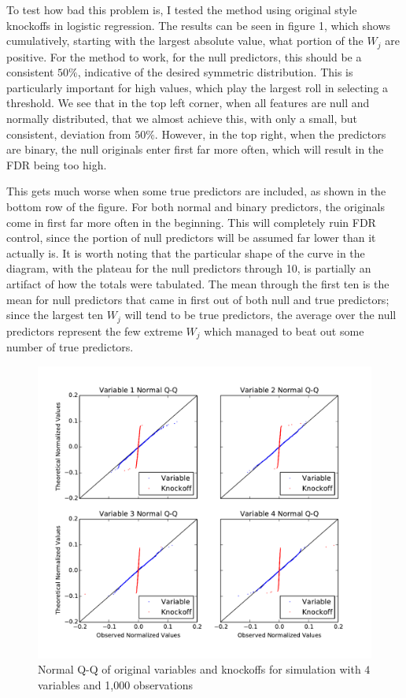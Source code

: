 \documentclass[11pt]{article}
\theoremstyle{definition}
\begin{document}
    To test how bad this problem is, I tested the method using original style knockoffs in logistic regression. The results can be seen in figure 1, which shows cumulatively, starting with the largest absolute value, what portion of the $W_j$ are positive. For the method to work, for the null predictors, this should be a consistent $50\%$, indicative of the desired symmetric distribution. This is particularly important for high values, which play the largest roll in selecting a threshold. We see that in the top left corner, when all features are null and normally distributed, that we almost achieve this, with only a small, but consistent, deviation from $50\%$. However, in the top right, when the predictors are binary, the null originals enter first far more often, which will result in the FDR being too high. \par
    \FloatBarrier
    This gets much worse when some true predictors are included, as shown in the bottom row of the figure. For both normal and binary predictors, the originals come in first far more often in the beginning. This will completely ruin FDR control, since the portion of null predictors will be assumed far lower than it actually is. It is worth noting that the particular shape of the curve in the diagram, with the plateau for the null predictors through 10, is partially an artifact of how the totals were tabulated. The mean through the first ten is the mean for null predictors that came in first out of both null and true predictors; since the largest ten $W_j$ will tend to be true predictors, the average over the null predictors represent the few extreme $W_j$ which managed to beat out some number of true predictors.  \par
    \begin{figure}[h]
        \includegraphics[width=14cm]{images/normalQQ}
        \caption{Normal Q-Q of original variables and knockoffs for simulation with $4$ variables and 1,000 observations}
    \end{figure}
\end{document}
